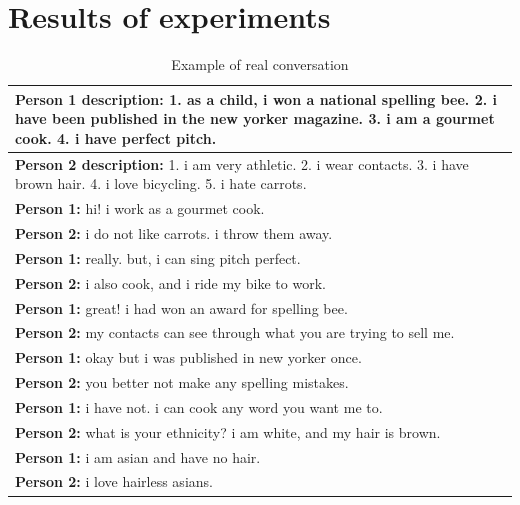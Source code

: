 \chapter{Results of experiments}

\begin{table}[ht]
\centering
 \begin{tabular}{|p{14cm}|} 
 \hline\hline
 \textbf{Person 1 description:} 1. as a child, i won a national spelling bee. 2. i have been published in the new yorker magazine. 3. i am a gourmet cook. 4. i have perfect pitch. \\
 \hline
 \textbf{Person 2 description:} 1. i am very athletic.  2. i wear contacts. 3. i have brown hair. 4. i love bicycling. 5. i hate carrots. \\
 \hline\hline
 \textbf{Person 1:} hi! i work as a gourmet cook. \\
 \textbf{Person 2:} i do not like carrots. i throw them away.\\ 
 \textbf{Person 1:} really. but, i can sing pitch perfect. \\
 \textbf{Person 2:} i also cook, and i ride my bike to work. \\
 \textbf{Person 1:} great! i had won an award for spelling bee. \\
 \textbf{Person 2:} my contacts can see through what you are trying to sell me. \\
 \textbf{Person 1:} okay but i was published in new yorker once. \\
 \textbf{Person 2:} you better not make any spelling mistakes. \\
 \textbf{Person 1:} i have not. i can cook any word you want me to. \\
 \textbf{Person 2:} what is your ethnicity? i am white, and my hair is brown. \\
 \textbf{Person 1:} i am asian and have no hair. \\
 \textbf{Person 2:} i love hairless asians. \\
 \hline\hline
 \end{tabular}
 \caption{Example of real conversation}
\label{tab:real_conversation}
\end{table}

